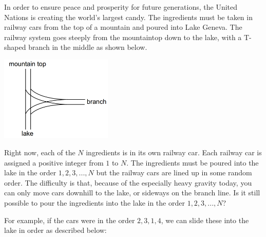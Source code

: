 
In order to ensure peace and prosperity for future generations, the United Nations is creating the world's largest candy. The ingredients must be taken in railway cars from the top of a mountain and poured into Lake Geneva. The railway system goes steeply from the mountaintop down to the lake, with a T-shaped branch in the middle as shown below.

\begin{center}
\includegraphics[width=0.4\textwidth]{confection}
\end{center}

Right now, each of the $N$ ingredients is in its own railway car. Each railway car is assigned a positive integer from $1$ to $N$. The ingredients must be poured into the lake in the order $1, 2, 3, ..., N$ but the railway cars are lined up in some random order. The difficulty is that, because of the especially heavy gravity today, you can only move cars downhill to the lake, or sideways on the branch line. Is it still possible to pour the ingredients into the lake in the order $1, 2, 3, ..., N$? 

For example, if the cars were in the order $2, 3, 1, 4$, we can slide these into the lake in order as described below:

